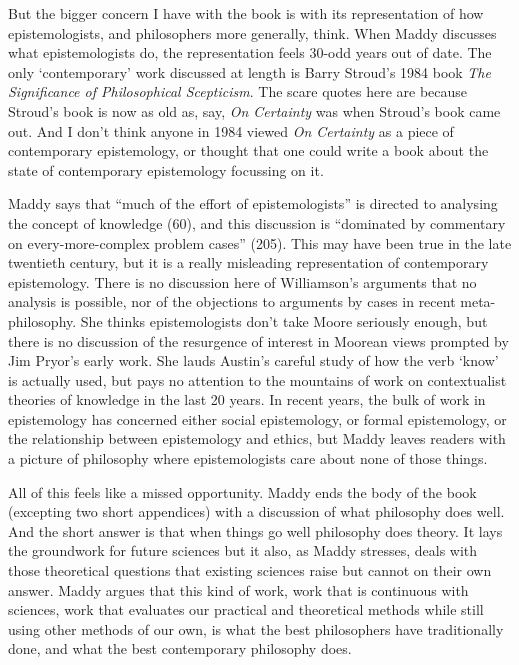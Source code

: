 \documentclass[
  10pt,
  letterpaper,
  DIV=11,
  numbers=noendperiod,
  twoside]{scrartcl}
\begin{document}
But the bigger concern I have with the book is with its representation
of how epistemologists, and philosophers more generally, think. When
Maddy discusses what epistemologists do, the representation feels 30-odd
years out of date. The only `contemporary' work discussed at length is
Barry Stroud's 1984 book \emph{The Significance of Philosophical
Scepticism}. The scare quotes here are because Stroud's book is now as
old as, say, \emph{On Certainty} was when Stroud's book came out. And I
don't think anyone in 1984 viewed \emph{On Certainty} as a piece of
contemporary epistemology, or thought that one could write a book about
the state of contemporary epistemology focussing on it.

Maddy says that ``much of the effort of epistemologists'' is directed to
analysing the concept of knowledge (60), and this discussion is
``dominated by commentary on every-more-complex problem cases'' (205).
This may have been true in the late twentieth century, but it is a
really misleading representation of contemporary epistemology. There is
no discussion here of Williamson's arguments that no analysis is
possible, nor of the objections to arguments by cases in recent
meta-philosophy. She thinks epistemologists don't take Moore seriously
enough, but there is no discussion of the resurgence of interest in
Moorean views prompted by Jim Pryor's early work. She lauds Austin's
careful study of how the verb `know' is actually used, but pays no
attention to the mountains of work on contextualist theories of
knowledge in the last 20 years. In recent years, the bulk of work in
epistemology has concerned either social epistemology, or formal
epistemology, or the relationship between epistemology and ethics, but
Maddy leaves readers with a picture of philosophy where epistemologists
care about none of those things.

All of this feels like a missed opportunity. Maddy ends the body of the
book (excepting two short appendices) with a discussion of what
philosophy does well. And the short answer is that when things go well
philosophy does theory. It lays the groundwork for future sciences but
it also, as Maddy stresses, deals with those theoretical questions that
existing sciences raise but cannot on their own answer. Maddy argues
that this kind of work, work that is continuous with sciences, work that
evaluates our practical and theoretical methods while still using other
methods of our own, is what the best philosophers have traditionally
done, and what the best contemporary philosophy does.
\end{document}
